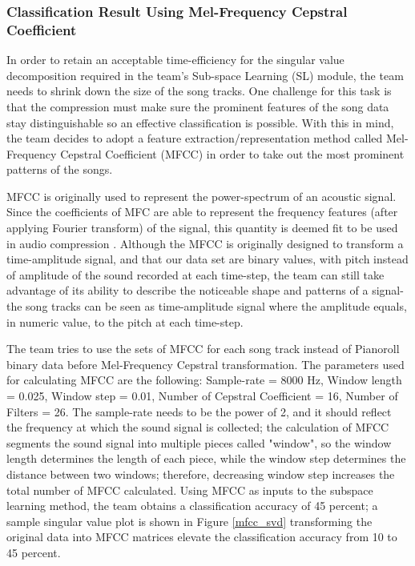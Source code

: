 \begin{par}
    \subsubsection{Classification Result Using Mel-Frequency Cepstral Coefficient}
    \par \hspace{15pt} In order to retain an acceptable time-efficiency for the singular value decomposition required in the team's Sub-space Learning (SL) module, the team needs to shrink down the size of the song tracks. One challenge for this task is that the compression must make sure the prominent features of the song data stay distinguishable so an effective classification is possible. With this in mind, the team decides to adopt a feature extraction/representation method called Mel-Frequency Cepstral Coefficient (MFCC) in order to take out the most prominent patterns of the songs.
    \par MFCC is originally used to represent the power-spectrum of an acoustic signal. Since the coefficients of MFC are able to represent the frequency features (after applying Fourier transform) of the signal, this quantity is deemed fit to be used in audio compression \cite{Logan00melfrequency}. Although the MFCC is originally designed to transform a time-amplitude signal, and that our data set are binary values, with pitch instead of amplitude of the sound recorded at each time-step, the team can still take advantage of its ability to describe the noticeable shape and patterns of a signal-the song tracks can be seen as time-amplitude signal where the amplitude equals, in numeric value, to the pitch at each time-step.
    \par The team tries to use the sets of MFCC for each song track instead of Pianoroll binary data before Mel-Frequency Cepstral transformation. The parameters used for calculating MFCC are the following: Sample-rate = 8000 Hz, Window length = 0.025, Window step = 0.01, Number of Cepstral Coefficient = 16, Number of Filters = 26. The sample-rate needs to be the power of 2, and it should reflect the frequency at which the sound signal is collected; the calculation of MFCC segments the sound signal into multiple pieces called "window", so the window length determines the length of each piece, while the window step determines the distance between two windows; therefore, decreasing window step increases the total number of MFCC calculated. Using MFCC as inputs to the subspace learning method, the team obtains a classification accuracy of 45 percent; a sample singular value plot is shown in Figure \ref{mfcc_svd} transforming the original data into MFCC matrices elevate the classification accuracy from 10 to 45 percent.

\end{par}
